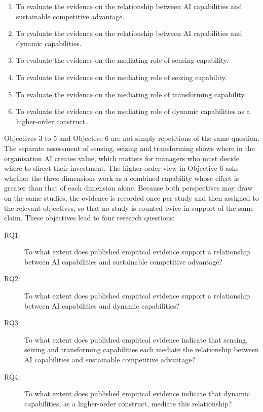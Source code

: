 \begin{enumerate}
  \item To evaluate the evidence on the relationship between AI capabilities and sustainable competitive advantage.
  \item To evaluate the evidence on the relationship between AI capabilities and dynamic capabilities.
  \item To evaluate the evidence on the mediating role of sensing capability.
  \item To evaluate the evidence on the mediating role of seizing capability.
  \item To evaluate the evidence on the mediating role of transforming capability.
  \item To evaluate the evidence on the mediating role of dynamic capabilities as a higher-order construct.
\end{enumerate}

Objectives 3 to 5 and Objective 6 are not simply repetitions of the same question. The separate assessment of sensing, seizing and transforming shows where in the organisation AI creates value, which matters for managers who must decide where to direct their investment. The higher-order view in Objective 6 asks whether the three dimensions work as a combined capability whose effect is greater than that of each dimension alone. Because both perspectives may draw on the same studies, the evidence is recorded once per study and then assigned to the relevant objectives, so that no study is counted twice in support of the same claim. These objectives lead to four research questions:

\begin{description}
  \item[RQ1:] To what extent does published empirical evidence support a relationship between AI capabilities and sustainable competitive advantage?
  \item[RQ2:] To what extent does published empirical evidence support a relationship between AI capabilities and dynamic capabilities?
  \item[RQ3:] To what extent does published empirical evidence indicate that sensing, seizing and transforming capabilities each mediate the relationship between AI capabilities and sustainable competitive advantage?
  \item[RQ4:] To what extent does published empirical evidence indicate that dynamic capabilities, as a higher-order construct, mediate this relationship?
\end{description}

